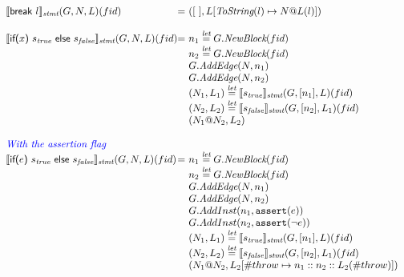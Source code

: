 \[\begin{array}{l@{}l@{~}l}
\transfun{\ircfgbreak{l}}_{\emph{stmt}}(G,N,L)(fid) & = &
	([\ ], L[\ToString(l) \mapsto N@L(l)])\\
	& & \\
\transfun{\irifelse{x}{s_{\emph{true}}}{s_{\emph{false}}}}_{\emph{stmt}}(G,N,L)(fid) & = &
	n_1 \letval G.\emph{NewBlock}(fid)\\
	& & n_2 \letval G.\emph{NewBlock}(fid)\\
	& & G.\emph{AddEdge}(N,n_1)\\
	& & G.\emph{AddEdge}(N,n_2)\\
	& & (N_1,L_1) \letval \transfun{s_{\emph{true}}}_{\emph{stmt}}(G,[n_1],L)(fid)\\
	& & (N_2,L_2) \letval \transfun{s_{\emph{false}}}_{\emph{stmt}}(G,[n_2],L_1)(fid)\\
	& & (N_1@N_2,L_2)\\
	& & \\
	
{\inblue \textit{With the assertion flag}} \\
\transfun{\irifelse{e}{s_{\emph{true}}}{s_{\emph{false}}}}_{\emph{stmt}}(G,N,L)(fid) & = &
	n_1 \letval G.\emph{NewBlock}(fid)\\
	& & n_2 \letval G.\emph{NewBlock}(fid)\\
	& & G.\emph{AddEdge}(N,n_1)\\
	& & G.\emph{AddEdge}(N,n_2)\\
	& & G.AddInst(n_1, \TT{assert}(e))\\
	& & G.AddInst(n_2, \TT{assert}(\neg e))\\
	& & (N_1,L_1) \letval \transfun{s_{\emph{true}}}_{\emph{stmt}}(G,[n_1],L)(fid)\\
	& & (N_2,L_2) \letval \transfun{s_{\emph{false}}}_{\emph{stmt}}(G,[n_2],L_1)(fid)\\
	& & (N_1@N_2,L_2[\#throw \mapsto n_1::n_2::L_2(\#throw)])\\
	& & \\

\end{array}
\]

